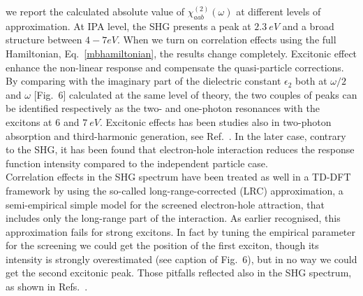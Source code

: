 we report the calculated absolute value of $\chi^{(2)}_{aab} (\omega)$ at different levels of approximation. 
At IPA level, the SHG presents a peak at $2.3~eV$ and a broad structure between $4 - 7 eV$. When we turn on correlation effects using the full Hamiltonian, Eq.~\eqref{mbhamiltonian}, the results change completely.
Excitonic effect enhance the non-linear response and compensate the quasi-particle corrections. By comparing with the imaginary part of the dielectric constant $\epsilon_2$ both at $\omega/2$ and  $\omega$ [Fig.~6] calculated at the same level of theory, the two couples of peaks can be identified respectively as the two- and one-photon resonances with the excitons at $6$ and $7~eV$. 
Excitonic effects has been studies also in two-photon absorption and third-harmonic generation, see Ref.~. In the later case, contrary to the SHG, it has been found that electron-hole interaction reduces the response function intensity compared to the independent particle case.\\ 
Correlation effects in the SHG spectrum have been treated as well in a TD-DFT framework\cite{PhysRevB.82.235201} by using the so-called long-range-corrected (LRC) approximation,\cite{LRC} a semi-empirical simple model for the screened electron-hole attraction, that includes only the long-range part of the interaction. %
As earlier recognised, this approximation fails for strong excitons. In fact by tuning the empirical parameter for the screening we could get the position of the first exciton, though its intensity is strongly overestimated (see caption of Fig.~6), but in no way we could get the second excitonic peak. Those pitfalls reflected also in the SHG spectrum, as shown in Refs.~\cite{gruningtddf1,gruningtddf2}. 
